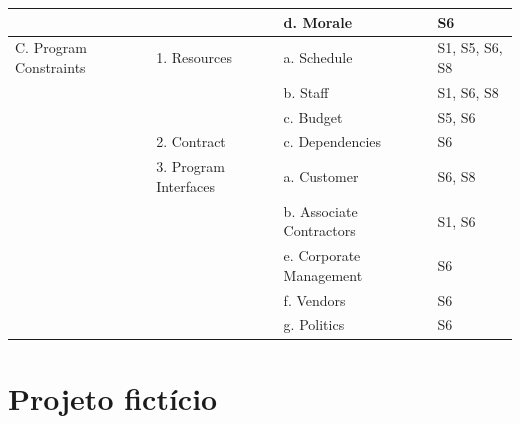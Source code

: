 \documentclass[
	12pt,
	openright,
	twoside,
	a4paper,
	english,
	brazil
	]{abntex2}
\begin{document}
\begin{longtable}{|>{\raggedright\arraybackslash}p{2.4cm}|p{4.5cm}|p{4.7cm}|l|}
  \cline{3-4}
  & & d. Morale & S6 \\
  \hline
  C. Program Constraints & 1. Resources & a. Schedule & S1, S5, S6, S8 \\
  \cline{3-4}
  & & b. Staff & S1, S6, S8 \\
  \cline{3-4}
  & & c. Budget & S5, S6 \\
  \cline{2-4}
  & 2. Contract & c. Dependencies & S6 \\
  \cline{2-4}
  & 3. Program Interfaces & a. Customer & S6, S8 \\
  \cline{3-4}
  & & b. Associate Contractors & S1, S6 \\
  \cline{3-4}
  & & e. Corporate Management & S6 \\
  \cline{3-4}
  & & f. Vendors & S6 \\
  \cline{3-4}
  & & g. Politics & S6 \\
  \hline
\end{longtable}

\chapter{Projeto fictício}
\label{apendiceD}



\printindex

\end{document}
